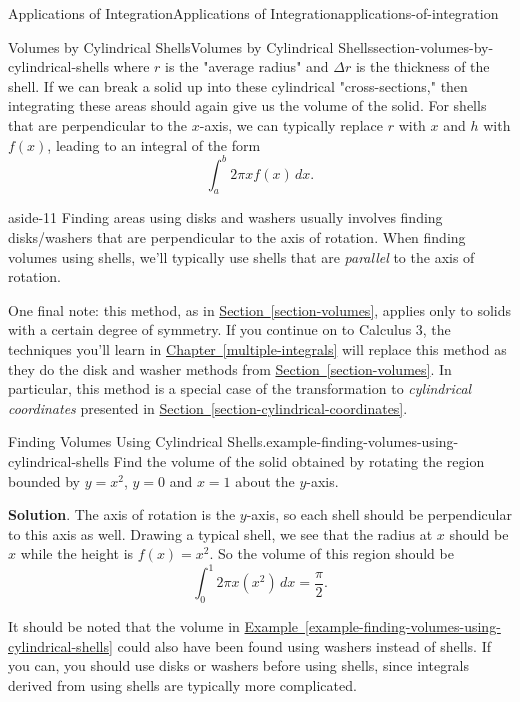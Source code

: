 \documentclass[oneside,10pt,]{book}
\numberwithin{equation}{section}
\begin{document}
\begin{chapterptx}{Applications of Integration}{}{Applications of Integration}{}{}{applications-of-integration}
\begin{sectionptx}{Volumes by Cylindrical Shells}{}{Volumes by Cylindrical Shells}{}{}{section-volumes-by-cylindrical-shells}
where \(r\) is the "average radius" and \(\Delta r\) is the thickness of the shell. If we can break a solid up into these cylindrical "cross-sections," then integrating these areas should again give us the volume of the solid. For shells that are perpendicular to the \(x\)-axis, we can typically replace \(r\) with \(x\) and \(h\) with \(f(x)\), leading to an integral of the form%
\begin{equation*}
\int_{a}^{b}2\pi xf(x)\,dx.
\end{equation*}
\begin{aside}{}{aside-11}%
\hypertarget{p-640}{}%
Finding areas using disks and washers usually involves finding disks\slash{}washers that are perpendicular to the axis of rotation. When finding volumes using shells, we'll typically use shells that are \emph{parallel} to the axis of rotation.%
\end{aside}
%
\par
\hypertarget{p-641}{}%
One final note: this method, as in \hyperref[section-volumes]{Section~\ref{section-volumes}}, applies only to solids with a certain degree of symmetry. If you continue on to Calculus 3, the techniques you'll learn in \hyperref[multiple-integrals]{Chapter~\ref{multiple-integrals}} will replace this method as they do the disk and washer methods from \hyperref[section-volumes]{Section~\ref{section-volumes}}. In particular, this method is a special case of the transformation to \emph{cylindrical coordinates} presented in \hyperref[section-cylindrical-coordinates]{Section~\ref{section-cylindrical-coordinates}}.%
\begin{example}{Finding Volumes Using Cylindrical Shells.}{example-finding-volumes-using-cylindrical-shells}%
\hypertarget{p-642}{}%
Find the volume of the solid obtained by rotating the region bounded by \(y = x^{2}\), \(y = 0\) and \(x = 1\) about the \(y\)-axis.%
\par\smallskip%
\noindent\textbf{Solution}.\hypertarget{solution-140}{}\quad%
\hypertarget{p-643}{}%
The axis of rotation is the \(y\)-axis, so each shell should be perpendicular to this axis as well. Drawing a typical shell, we see that the radius at \(x\) should be \(x\) while the height is \(f(x) = x^{2}\). So the volume of this region should be%
\begin{equation*}
\int_{0}^{1}2\pi x(x^{2})\,dx = \frac{\pi}{2}.
\end{equation*}
%
\end{example}
\hypertarget{p-644}{}%
It should be noted that the volume in \hyperref[example-finding-volumes-using-cylindrical-shells]{Example~\ref{example-finding-volumes-using-cylindrical-shells}} could also have been found using washers instead of shells. If you can, you should use disks or washers before using shells, since integrals derived from using shells are typically more complicated.%

\end{sectionptx}
\end{chapterptx}
\end{document}
